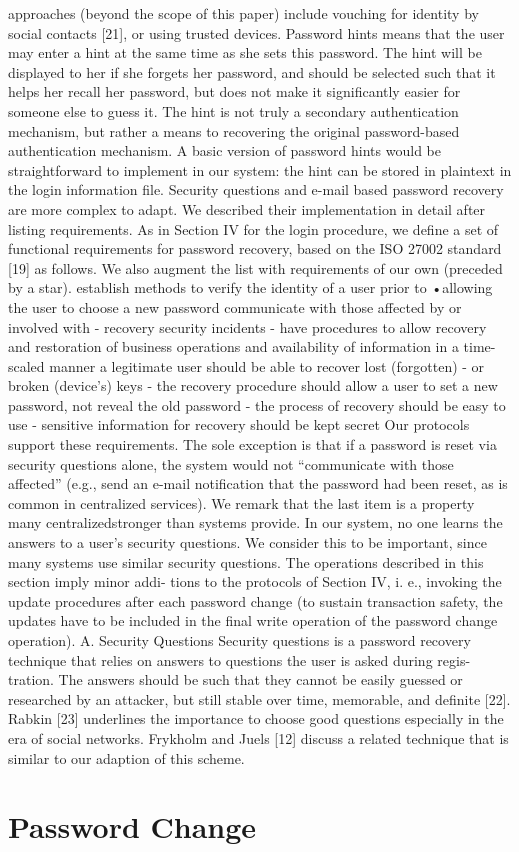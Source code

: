 approaches (beyond the scope of this paper) include vouching
for identity by social contacts [21], or using trusted devices.
 Password hints means that the user may enter a hint at
the same time as she sets this password. The hint will be
displayed to her if she forgets her password, and should be
selected such that it helps her recall her password, but does
not make it significantly easier for someone else to guess it.
The hint is not truly a secondary authentication mechanism,
but rather a means to recovering the original password-based
authentication mechanism. A basic version of password hints
would be straightforward to implement in our system: the
hint can be stored in plaintext in the login information file.
Security questions and e-mail based password recovery are
more complex to adapt. We described their implementation in
detail after listing requirements.
 As in Section IV for the login procedure, we define a set of
functional requirements for password recovery, based on the
ISO 27002 standard [19] as follows. We also augment the list
with requirements of our own (preceded by a star).
establish methods to verify the identity of a user prior to
•allowing the user to choose a new password
communicate with those affected by or involved with
 - recovery security incidents
 - have procedures to allow recovery and restoration of
business operations and availability of information in a
 time-scaled manner
a legitimate user should be able to recover lost (forgotten)
 - or broken (device’s) keys
 - the recovery procedure should allow a user to set a new
 password, not reveal the old password
 - the process of recovery should be easy to use
 - sensitive information for recovery should be kept secret
Our protocols support these requirements. The sole exception
is that if a password is reset via security questions alone, the
system would not “communicate with those affected” (e.g.,
send an e-mail notification that the password had been reset,
as is common in centralized services). We remark that the
last item is a property many centralizedstronger than systems
provide. In our system, no one learns the answers to a user’s
security questions. We consider this to be important, since
many systems use similar security questions.
 The operations described in this section imply minor addi-
tions to the protocols of Section IV, i. e., invoking the update
procedures after each password change (to sustain transaction
safety, the updates have to be included in the final write
operation of the password change operation).
A. Security Questions
 Security questions is a password recovery technique that
relies on answers to questions the user is asked during regis-
tration. The answers should be such that they cannot be easily
guessed or researched by an attacker, but still stable over
time, memorable, and definite [22]. Rabkin [23] underlines
the importance to choose good questions especially in the era
of social networks. Frykholm and Juels [12] discuss a related
technique that is similar to our adaption of this scheme.
 

\section{Password Change}


